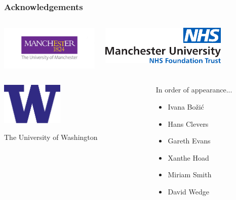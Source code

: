 \documentclass{beamer}
\begin{document}
\begin{frame}
    \frametitle{Acknowledgements}
    \begin{columns}
        \begin{column}{0.5\textwidth}
        \includegraphics[width=\textwidth]{figures/logo_big.jpg}
        \end{column}
        \begin{column}{0.5\textwidth}
        \includegraphics[width=0.75\textwidth]{figures/MFT-logo}
        \end{column}
    \end{columns}
    \begin{columns}
        \begin{column}{0.5\textwidth}
        \begin{center}
        \includegraphics[width=0.4\textwidth]{figures/W-Logo_Purple1}
        \end{center}

        The University of Washington
        \end{column}
        \begin{column}{0.5\textwidth}
        In order of appearance...

        \begin{itemize}
            \item Ivana Bo\v{z}i\'{c}
            \item Hans Clevers
            \item Gareth Evans
            \item Xanthe Hoad
            \item Miriam Smith
            \item David Wedge
        \end{itemize}

        \end{column}
    \end{columns}
\end{frame}
\end{document}

